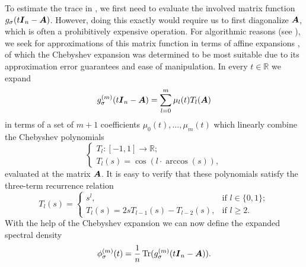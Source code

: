 To estimate the trace in , we first need to evaluate the involved matrix function $g_{\sigma}(t\boldsymbol{I}_n - \boldsymbol{A})$. However, doing this exactly would require us to first diagonalize $\boldsymbol{A}$, which is often a prohibitively expensive operation. For algorithmic reasons (see ), we seek for approximations of this matrix function in terms of affine expansions , of which the Chebyshev expansion was determined to be most suitable due to its approximation error guarantees and ease of manipulation. In every $t \in \mathbb{R}$ we expand 
\begin{equation}
    g_{\sigma}^{(m)}(t\boldsymbol{I}_n - \boldsymbol{A}) = \sum_{l=0}^{m} \mu_l(t) T_l(\boldsymbol{A})
    \label{equ:matrix-expansion}
\end{equation}
in terms of a set of $m+1$ coefficients $\mu_0(t), \dots, \mu_m(t)$ which linearly combine the Chebyshev polynomials
\begin{equation}
    \begin{cases}
        T_l : [-1, 1] \to \mathbb{R}; \\
        T_l(s) = \cos(l \cdot \arccos(s)),
    \end{cases}
    \label{equ:chebyshev-polynomial}
\end{equation}
evaluated at the matrix $\boldsymbol{A}$. It is easy to verify that these polynomials satisfy the three-term recurrence relation
\begin{equation}
    T_l(s) =
    \begin{cases}
        s^l, & \text{if $l \in \{0, 1\}$}; \\
        T_l(s) = 2 s T_{l-1}(s) - T_{l-2}(s), & \text{if $l \geq 2$.}
    \end{cases}
    \label{equ:chebyshev-recurrence}
\end{equation}
With the help of the Chebyshev expansion  we can now define the expanded spectral density
\begin{equation}
    \phi_{\sigma}^{(m)}(t) =  \frac{1}{n} \operatorname{Tr}(g_{\sigma}^{(m)}(t \boldsymbol{I}_n - \boldsymbol{A})).
    \label{equ:expanded-spectral-density}
\end{equation}

